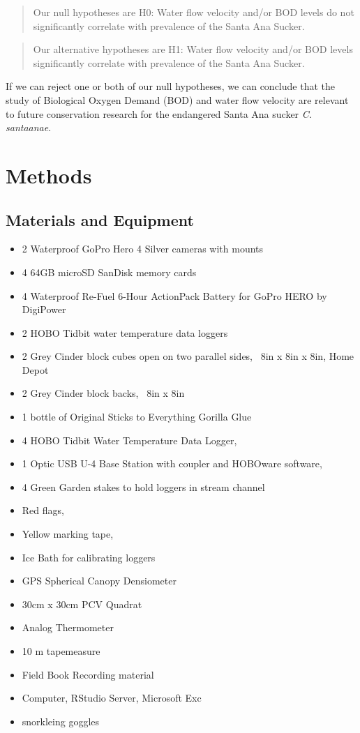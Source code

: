 \documentclass{article}
\begin{document}
\begin{quote}
Our null hypotheses are H0: Water flow velocity and/or BOD levels do not significantly correlate with prevalence of the Santa Ana Sucker.
\end{quote}
\begin{quote}
Our alternative hypotheses are H1: Water flow velocity and/or BOD levels significantly correlate with prevalence of the Santa Ana Sucker.
\end{quote}
If we can reject one or both of our null hypotheses, we can conclude that the study of Biological Oxygen Demand (BOD) and water flow velocity are relevant to future conservation research for the endangered Santa Ana sucker \emph{C. santaanae}.


\section{Methods}

\subsection{Materials and Equipment}
\begin{itemize}
\item 2 Waterproof GoPro Hero 4 Silver cameras with mounts
\item 4 64GB microSD SanDisk memory cards
\item 4 Waterproof Re-Fuel 6-Hour ActionPack Battery for GoPro HERO by DigiPower
\item 2 HOBO Tidbit water temperature data loggers
\item 2 Grey Cinder block cubes open on two parallel sides, ~8in x 8in x 8in, Home Depot
\item 2 Grey Cinder block backs, ~8in x 8in
\item 1 bottle of Original Sticks to Everything Gorilla Glue
\item 4 HOBO Tidbit Water Temperature Data Logger,
\item 1 Optic USB U-4 Base Station with coupler and HOBOware software,
\item 4 Green Garden stakes to hold loggers in stream channel
\item Red flags,
\item Yellow marking tape,
\item Ice Bath for calibrating loggers
\item GPS Spherical Canopy Densiometer
\item 30cm x 30cm PCV Quadrat
\item Analog Thermometer
\item 10 m tapemeasure
\item Field Book Recording material
\item Computer, RStudio Server, Microsoft Exc
\item snorkleing goggles 

\end{itemize}
\end{document}
